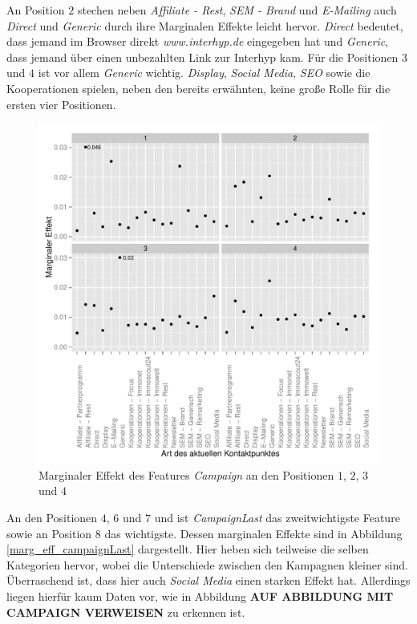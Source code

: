 An Position $2$ stechen neben \textit{Affiliate - Rest}, \textit{SEM - Brand} und \textit{E-Mailing} auch \textit{Direct} und \textit{Generic} durch ihre Marginalen Effekte leicht hervor. \textit{Direct} bedeutet, dass jemand im Browser direkt \textit{www.interhyp.de} eingegeben hat und \textit{Generic}, dass jemand über einen unbezahlten Link zur Interhyp kam.
Für die Positionen $3$ und $4$ ist vor allem \textit{Generic} wichtig. \textit{Display}, \textit{Social Media}, \textit{SEO} sowie die Kooperationen spielen, neben den bereits erwähnten, keine große Rolle für die ersten vier Positionen.
\begin{figure}[H]
	\centering\includegraphics[scale=0.75]{marg_eff_campaign.pdf}\caption{Marginaler Effekt des Features \textit{Campaign} an den Positionen $1$, $2$, $3$ und $4$}\label{marg_eff_campaign}
\end{figure}
An den Positionen $4$, $6$ und $7$ und ist \textit{CampaignLast} das zweitwichtigste Feature sowie an Position $8$ das wichtigste. Dessen marginalen Effekte sind in Abbildung \ref{marg_eff_campaignLast} dargestellt. Hier heben sich teilweise die selben Kategorien hervor, wobei die Unterschiede zwischen den Kampagnen kleiner sind. Überraschend ist, dass hier auch \textit{Social Media} einen starken Effekt hat. Allerdings liegen hierfür kaum Daten vor, wie in Abbildung \textbf{AUF ABBILDUNG MIT CAMPAIGN VERWEISEN} zu erkennen ist.\\
